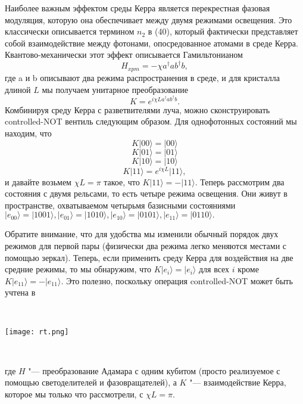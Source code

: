 \begin{multicols}{2}
{        Наиболее важным эффектом среды Керра является перекрестная
        фазовая модуляция, которую она обеспечивает между двумя режимами освещения. Это классически описывается термином $n_2$ в (40), который фактически представляет собой взаимодействие между фотонами, опосредованное атомами в среде Керра. Квантово-механически этот эффект описывается Гамильтонианом
        \begin{equation}
            H_{xpm}=-\chi a^{\dagger}ab^{\dagger}b, 
        \end{equation}
        где a и b описывают два режима распространения в среде, и для кристалла длиной $L$ мы получаем унитарное преобразование
        \begin{equation}
            K=e^{i\chi La^{\dagger}ab^{\dagger}b}.
        \end{equation}
        Комбинируя среду Керра с разветвителями луча, можно сконструировать controlled-NOT вентиль следующим образом. Для однофотонных состояний мы находим, что
        \begin{equation}
            K\vert00\rangle=\vert00\rangle
        \end{equation}
        \begin{equation}
            K\vert01\rangle=\vert01\rangle
        \end{equation}
        \begin{equation}
            K\vert10\rangle=\vert10\rangle
        \end{equation}
        \begin{equation}
            K\vert11\rangle=e^{i\chi L}\vert11\rangle,
        \end{equation}
        и давайте возьмем $\chi L = \pi$ такое, что $K\vert11\rangle=-\vert11\rangle$. Теперь рассмотрим два состояния с двумя рельсами, то есть четыре режима освещения. Они живут в пространстве, охватываемом четырьмя базисными состояниями 
        $\vert e_{00}\rangle=\vert1001\rangle, \vert e_{01}\rangle=\vert1010\rangle,\vert e_{10}\rangle=\vert0101\rangle,\vert e_{11}\rangle=\vert0110\rangle.$

        Обратите внимание, что для удобства мы изменили обычный порядок двух режимов для первой пары (физически два режима легко меняются местами с помощью зеркал). Теперь, если применить среду Керра для воздействия на
        две средние режимы, то мы обнаружим, что $K\vert e_{i}\rangle=\vert e_{i}\rangle$ для всех $i$ кроме $K\vert e_{11}\rangle=-\vert e_{11}\rangle.$
        Это полезно, поскольку операция controlled-NOT может быть учтена в
    }\\
    \begin{flushleft}
        \begin{minipage}{0.3\textwidth}{\texttt{[image: rt.png]}}
        \end{minipage}\\
        \vspace{0.3cm}
    \end{flushleft}
    \normalsize{
        где $H$ "--- преобразование Адамара с одним кубитом (просто реализуемое с помощью светоделителей и фазовращателей), а $K$ "--- взаимодействие Керра, которое мы только что рассмотрели, с $\chi L=\pi$. 

}
\end{multicols}

